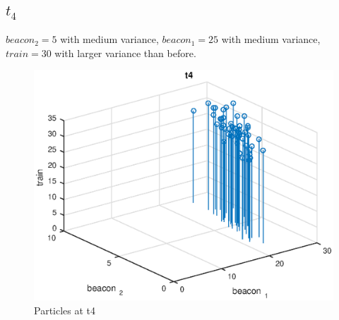 \documentclass{article}
\begin{document}
\subsection{$t_4$}

$beacon_2 = 5$ with medium variance, $beacon_1 = 25$ with medium  variance, $train=30$ with larger variance than before.



\begin{figure}[H]
	\centering
	\includegraphics[width=0.8\linewidth]{figures/t4.eps}
	\caption{Particles at t4}
	\label{t4}
\end{figure}
\end{document}
